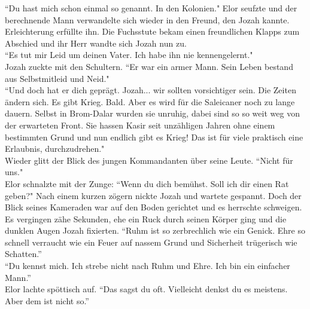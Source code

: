 ``Du hast mich schon einmal so genannt. In den Kolonien."
Elor seufzte und der berechnende Mann verwandelte sich wieder in den Freund, den Jozah kannte. 
Erleichterung erfüllte ihn. Die Fuchsstute bekam einen freundlichen Klapps zum Abschied und ihr 
Herr wandte sich Jozah nun zu. \\
``Es tut mir Leid um deinen Vater. Ich habe ihn nie kennengelernt."\\
Jozah zuckte mit den Schultern. ``Er war ein armer Mann. Sein Leben bestand aus Selbstmitleid und 
Neid."\\
``Und doch hat er dich geprägt. Jozah... wir sollten vorsichtiger sein. Die Zeiten ändern sich. Es 
gibt Krieg. Bald. Aber es wird für die Saleicaner noch zu lange dauern. Selbst in Brom-Dalar wurden 
sie unruhig, dabei sind so so weit weg von der erwarteten Front. Sie hassen Kasir seit unzähligen 
Jahren ohne einem bestimmten Grund und nun endlich gibt es Krieg! Das ist für viele praktisch eine 
Erlaubnis, durchzudrehen."\\
Wieder glitt der Blick des jungen Kommandanten über seine Leute. ``Nicht für uns."\\
Elor schnalzte mit der Zunge: ``Wenn du dich bemühst. Soll ich dir einen Rat geben?"
Nach einem kurzen zögern nickte Jozah und wartete gespannt. Doch der Blick seines Kameraden war auf 
den Boden gerichtet und es herrschte schweigen. Es vergingen zähe Sekunden, ehe ein Ruck durch 
seinen Körper ging und die dunklen Augen Jozah fixierten. ``Ruhm ist so zerbrechlich wie ein 
Genick. Ehre so schnell verraucht wie ein Feuer auf nassem Grund und Sicherheit trügerisch wie 
Schatten.''\\
``Du kennst mich. Ich strebe nicht nach Ruhm und Ehre. Ich bin ein einfacher Mann.''\\
Elor lachte spöttisch auf. ``Das sagst du oft. Vielleicht denkst du es meistens. Aber dem ist 
nicht so.''\\



